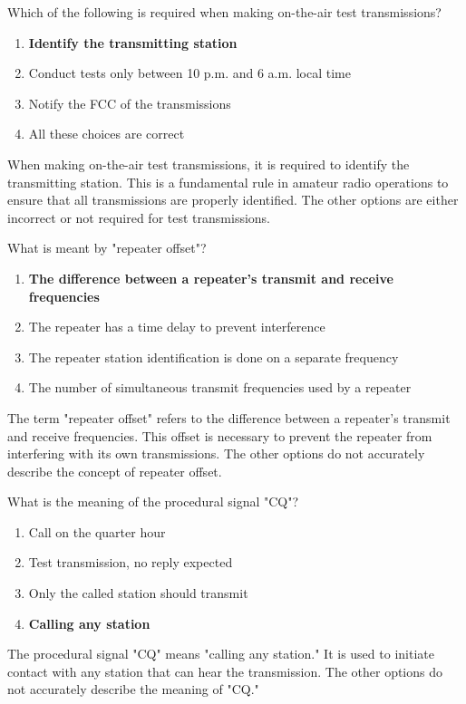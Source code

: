 \begin{tcolorbox}[colback=gray!10!white,colframe=black!75!black,title={T2A06}]
Which of the following is required when making on-the-air test transmissions?
\begin{enumerate}[label=\Alph*,noitemsep]
    \item \textbf{Identify the transmitting station}
    \item Conduct tests only between 10 p.m. and 6 a.m. local time
    \item Notify the FCC of the transmissions
    \item All these choices are correct
\end{enumerate}
\end{tcolorbox}
When making on-the-air test transmissions, it is required to identify the transmitting station. This is a fundamental rule in amateur radio operations to ensure that all transmissions are properly identified. The other options are either incorrect or not required for test transmissions.

\begin{tcolorbox}[colback=gray!10!white,colframe=black!75!black,title={T2A07}]
What is meant by "repeater offset"?
\begin{enumerate}[label=\Alph*,noitemsep]
    \item \textbf{The difference between a repeater’s transmit and receive frequencies}
    \item The repeater has a time delay to prevent interference
    \item The repeater station identification is done on a separate frequency
    \item The number of simultaneous transmit frequencies used by a repeater
\end{enumerate}
\end{tcolorbox}
The term "repeater offset" refers to the difference between a repeater’s transmit and receive frequencies. This offset is necessary to prevent the repeater from interfering with its own transmissions. The other options do not accurately describe the concept of repeater offset.

\begin{tcolorbox}[colback=gray!10!white,colframe=black!75!black,title={T2A08}]
What is the meaning of the procedural signal "CQ"?
\begin{enumerate}[label=\Alph*,noitemsep]
    \item Call on the quarter hour
    \item Test transmission, no reply expected
    \item Only the called station should transmit
    \item \textbf{Calling any station}
\end{enumerate}
\end{tcolorbox}
The procedural signal "CQ" means "calling any station." It is used to initiate contact with any station that can hear the transmission. The other options do not accurately describe the meaning of "CQ."

